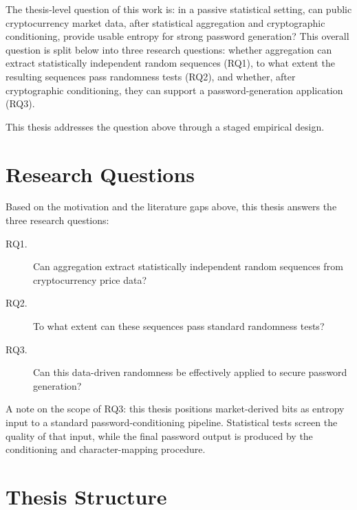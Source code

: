 \documentclass[11pt,titlepage,openany,oneside]{book}  %
\begin{document}
The thesis-level question of this work is: in a passive statistical setting, can public cryptocurrency market data, after statistical aggregation and cryptographic conditioning, provide usable entropy for strong password generation? This overall question is split below into three research questions: whether aggregation can extract statistically independent random sequences (RQ1), to what extent the resulting sequences pass randomness tests (RQ2), and whether, after cryptographic conditioning, they can support a password-generation application (RQ3).

This thesis addresses the question above through a staged empirical design.

\section{Research Questions}
\label{sec:research-questions}

Based on the motivation and the literature gaps above, this thesis answers the three research questions:
\begin{description}
\item[RQ1.] Can aggregation extract statistically independent random sequences from cryptocurrency price data?
\item[RQ2.] To what extent can these sequences pass standard randomness tests?
\item[RQ3.] Can this data-driven randomness be effectively applied to secure password generation?
\end{description}

A note on the scope of RQ3: this thesis positions market-derived bits as entropy input to a standard password-conditioning pipeline. Statistical tests screen the quality of that input, while the final password output is produced by the conditioning and character-mapping procedure.

\section{Thesis Structure}
\label{sec:thesis-structure}
\end{document}
